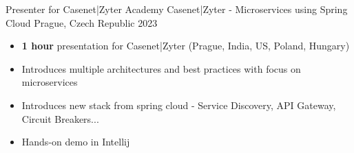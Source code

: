 \begin{cventries}
  \cventry
    {Presenter for Casenet|Zyter Academy} %
    { Casenet|Zyter - Microservices using Spring Cloud} %
    {Prague, Czech Republic} %
    {2023} %
    {
      \begin{itemize} %
        \vspace{-11pt} \item {\textbf{1 hour} presentation for Casenet|Zyter (Prague, India, US, Poland, Hungary)}
        \item {Introduces multiple architectures and best practices with focus on microservices}
        \item {Introduces new stack from spring cloud - Service Discovery, API Gateway, Circuit Breakers... }
        \item {Hands-on demo in Intellij }
      \end{itemize}
    }

\end{cventries}
